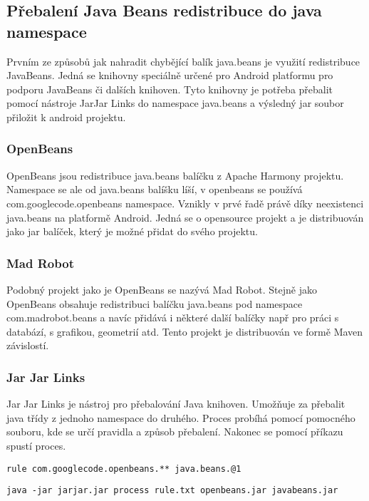 \subsection{Přebalení Java Beans redistribuce do java namespace}
Prvním ze způsobů jak nahradit chybějící balík java.beans je využití redistribuce JavaBeans. Jedná se knihovny speciálně určené pro Android platformu pro podporu JavaBeans či dalších knihoven. Tyto knihovny je potřeba přebalit pomocí nástroje JarJar Links do namespace java.beans a výsledný jar soubor přiložit k android projektu. 

\subsubsection{OpenBeans}
OpenBeans jsou redistribuce java.beans balíčku z Apache Harmony projektu. Namespace se ale od java.beans balíšku líší, v openbeans se používá com.googlecode.openbeans namespace. Vznikly v prvé řadě právě díky neexistenci java.beans na platformě Android. Jedná se o opensource projekt a je distribuován jako jar balíček, který je možné přidat do svého projektu. 

\subsubsection{Mad Robot}
Podobný projekt jako je OpenBeans se nazývá Mad Robot. Stejně jako OpenBeans obsahuje redistribuci balíčku java.beans pod namespace com.madrobot.beans a navíc přidává i některé další balíčky např pro práci s databází, s grafikou, geometrií atd. Tento projekt je distribuován ve formě Maven závislostí.

\subsubsection{Jar Jar Links}
Jar Jar Links je nástroj pro přebalování Java knihoven. Umožňuje za přebalit java třídy z jednoho namespace do druhého. Proces probíhá pomocí pomocného souboru, kde se určí pravidla a způsob přebalení. Nakonec se pomocí příkazu spustí proces.
\\
\begin{lstlisting}[captionpos={b},caption={Spanning tree broadcast algorithm.},frame={lines},label={rule},basicstyle=\footnotesize]
rule com.googlecode.openbeans.** java.beans.@1
\end{lstlisting}

\begin{lstlisting}[captionpos={b},caption={Spanning tree broadcast algorithm.},frame={lines},label={command},basicstyle=\footnotesize]
java -jar jarjar.jar process rule.txt openbeans.jar javabeans.jar
\end{lstlisting}

